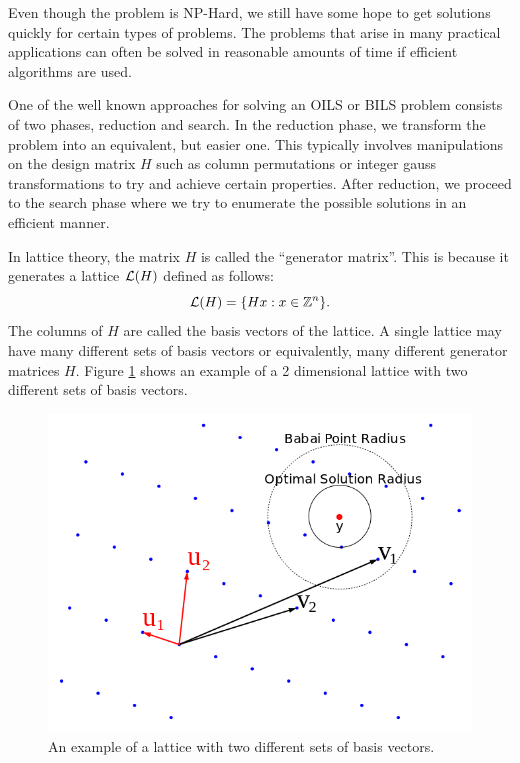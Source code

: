\documentclass[12pt,Bold,letterpaper]{mcgilletdclass}
\begin{document}
Even though the problem is NP-Hard, we still have some hope to get solutions
quickly for certain types of problems. The problems that arise in many practical applications can often be solved in reasonable amounts of time if efficient algorithms are used.

One of the well known approaches for solving an OILS or BILS problem consists of two phases,
reduction and search. In the reduction phase, we transform the problem into an
equivalent, but easier one. This typically involves manipulations on the design matrix $H$ such as column permutations
or integer gauss transformations to try and achieve certain properties. After reduction, we proceed to the search phase where we try to enumerate the possible solutions in an efficient manner.

In lattice theory, the matrix $H$ is called the ``generator matrix''. This is because it generates a lattice ${\cal{L}}(H)$ defined as follows:
\begin{equation}
{\cal{L}}(H) = \{Hx: x\in \mathbb{Z}^n\}.
\end{equation}
The columns of $H$ are called the basis vectors of the lattice. A single lattice may have many different sets of basis vectors or equivalently, many different generator matrices $H$. Figure \ref{fig:latticeBasis} shows an example of a 2 dimensional lattice with two different sets of basis vectors.

\begin{figure}
\centering
\includegraphics[scale=0.4]{latticebasis.png}
\caption{An example of a lattice with two different sets of basis vectors.}
\label{fig:latticeBasis}
\end{figure}
\end{document}
